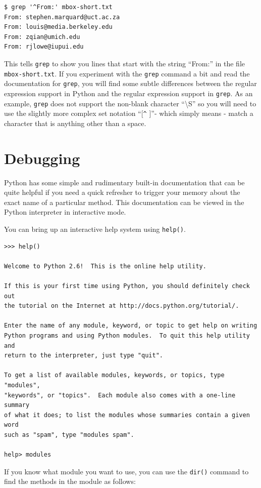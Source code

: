\documentclass[10pt]{book}
\begin{document}
\beforeverb
\begin{verbatim}
$ grep '^From:' mbox-short.txt
From: stephen.marquard@uct.ac.za
From: louis@media.berkeley.edu
From: zqian@umich.edu
From: rjlowe@iupui.edu
\end{verbatim}
\afterverb
%
This tells {\tt grep} to show you lines that start with the string ``From:'' in the file {\tt mbox-short.txt}.   If you experiment with the {\tt grep} command a bit and read the documentation for {\tt grep}, you will find some subtle differences between the regular expression support in Python and the regular expression support in {\tt grep}.  As an example, {\tt grep} does not support the non-blank character ``{\textbackslash}S'' so you will need to use the slightly more complex set notation ``[\verb"^" ]''- which simply means - match a character that is anything other than a space.

\section{Debugging}

Python has some simple and rudimentary built-in documentation that can be quite helpful if you need a quick refresher to trigger your memory about the exact name of a particular method.   This documentation can be viewed in the Python interpreter in interactive mode.

You can bring up an interactive help system using {\tt help()}.

\beforeverb
\begin{verbatim}
>>> help()

Welcome to Python 2.6!  This is the online help utility.

If this is your first time using Python, you should definitely check out
the tutorial on the Internet at http://docs.python.org/tutorial/.

Enter the name of any module, keyword, or topic to get help on writing
Python programs and using Python modules.  To quit this help utility and
return to the interpreter, just type "quit".

To get a list of available modules, keywords, or topics, type "modules",
"keywords", or "topics".  Each module also comes with a one-line summary
of what it does; to list the modules whose summaries contain a given word
such as "spam", type "modules spam".

help> modules
\end{verbatim}
\afterverb
%
If you know what module you want to use, you can use the {\tt dir()} command to find the methods in the module as follows:
\end{document}
